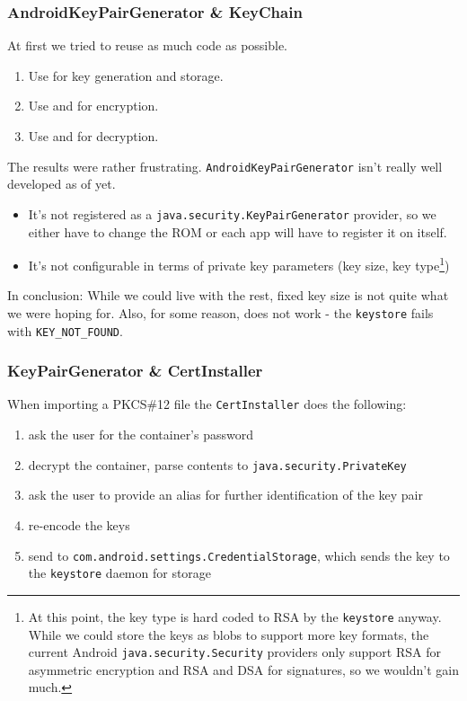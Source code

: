\documentclass[a4paper,draft]{scrartcl}
\begin{document}
		\subsubsection{AndroidKeyPairGenerator \& KeyChain}
			At first we tried to reuse as much code as possible.		
			\begin{enumerate}
				\item Use  for key generation and storage.
				\item Use  and  for encryption.
				\item Use  and  for decryption.
			\end{enumerate}
			The results were rather frustrating. \texttt{AndroidKeyPairGenerator} isn't really well developed as of yet.
			\begin{itemize}
				\item It's not registered as a \texttt{java.security.KeyPairGenerator} provider, so we either have to change the ROM or each app will have to register it on itself.
				\item It's not configurable in terms of private key parameters (key size, key type\footnote{At this point, the key type is hard coded to RSA by the \texttt{keystore} anyway. While we could store the keys as blobs to support more key formats, the current Android \texttt{java.security.Security} providers only support RSA for asymmetric encryption and RSA and DSA for signatures, so we wouldn't gain much.})
			\end{itemize}
			In conclusion: While we could live with the rest, fixed key size is not quite what we were hoping for. Also, for some reason,  does not work - the \texttt{keystore} fails with \texttt{KEY\_NOT\_FOUND}.



		\subsubsection{KeyPairGenerator \& CertInstaller}
			When importing a PKCS\#12 file the \texttt{CertInstaller} does the following:
			\begin{enumerate}
			\item ask the user for the container's password
			\item decrypt the container, parse contents to \texttt{java.security.PrivateKey}
			\item ask the user to provide an alias for further identification of the key pair
			\item re-encode the keys
			\item send to \texttt{com.android.settings.CredentialStorage}, which sends the key to the \texttt{keystore} daemon for storage
			\end{enumerate}
			
\end{document}

